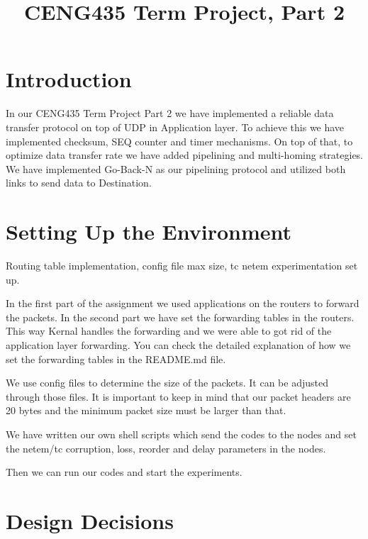 \documentclass[conference]{IEEEtran}
\begin{document}
\title{CENG435 Term Project, Part 2\\
}

\author{
\IEEEauthorblockA{
}
\and
{}
\IEEEauthorblockA{
}
}

\maketitle

\section{Introduction}

In our CENG435 Term Project Part 2 we have implemented a reliable data transfer protocol on top of UDP in Application layer. To achieve this we have implemented checksum, SEQ counter and timer mechanisms. On top of that, to optimize data transfer rate we have added pipelining and multi-homing strategies. We have implemented Go-Back-N as our pipelining protocol and utilized both links to send data to Destination.

\section{Setting Up the Environment}
 Routing table implementation, config file max size, tc netem experimentation set up.

In the first part of the assignment we used applications on the routers to forward the packets. In the second part we have set the forwarding tables in the routers. This way Kernal handles the forwarding and we were able to got rid of the application layer forwarding. You can check the detailed explanation of how we set the forwarding tables in the README.md file.

We use config files to determine the size of the packets. It can be adjusted through those files. It is important to keep in mind that our packet headers are 20 bytes and the minimum packet size must be larger than that.

We have written our own shell scripts which send the codes to the nodes and set the netem/tc corruption, loss, reorder and delay parameters in the nodes.

Then we can run our codes and start the experiments.

\section{Design Decisions}
\end{document}
